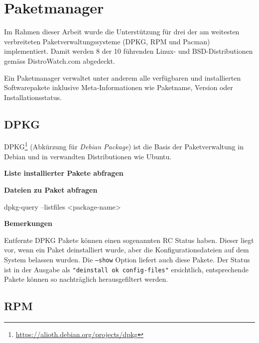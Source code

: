 

\section{Paketmanager}

Im Rahmen dieser Arbeit wurde die Unterstützung für drei der am weitesten
verbreiteten Paketverwaltungssysteme (DPKG, RPM und Pacman) implementiert. Damit
werden 8 der 10 führenden Linux- und BSD-Distributionen gemäss
DistroWatch.com\cite{distrowatch:2014} abgedeckt.

Ein Paketmanager verwaltet unter anderem alle verfügbaren und installierten
Softwarepakete inklusive Meta-Informationen wie Paketname, Version oder
Installationsstatus.

\subsection{DPKG}

DPKG\footnote{\url{https://alioth.debian.org/projects/dpkg}} (Abkürzung für
\textit{Debian Package}) ist die Basis der Paketverwaltung in Debian und in
verwandten Distributionen wie Ubuntu.

\textbf{Liste installierter Pakete abfragen}


\textbf{Dateien zu Paket abfragen}

\begin{bashcode}
dpkg-query --listfiles <package-name>
\end{bashcode}

\textbf{Bemerkungen}

Entfernte DPKG Pakete können einen sogenannten RC Status haben. Dieser liegt
vor, wenn ein Paket deinstalliert wurde, aber die Konfigurationsdateien auf dem
System belassen wurden. Die \texttt{---show} Option liefert auch diese Pakete.
Der Status ist in der Ausgabe als \texttt{"deinstall ok config-files"}
ersichtlich, entsprechende Pakete können so nachträglich herausgefiltert werden.


\subsection{RPM}

